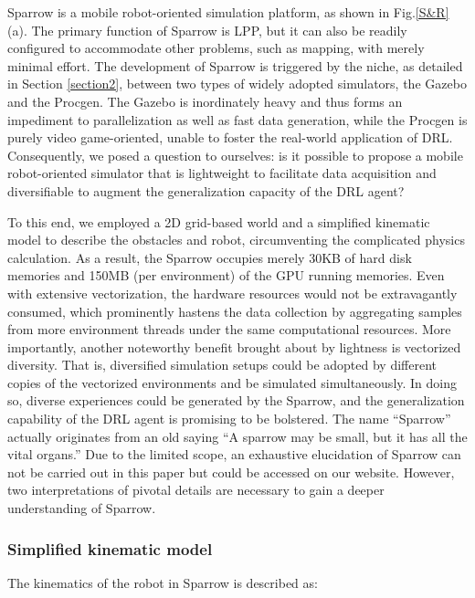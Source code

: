 \documentclass[journal]{IEEEtran}
\begin{document}
Sparrow is a mobile robot-oriented simulation platform, as shown in Fig.\ref{S&R}(a). The primary function of Sparrow is LPP, but it can also be readily configured to accommodate other problems, such as mapping, with merely minimal effort. The development of Sparrow is triggered by the niche, as detailed in Section \ref{section2}, between two types of widely adopted simulators, the Gazebo and the Procgen. The Gazebo is inordinately heavy and thus forms an impediment to parallelization as well as fast data generation, while the Procgen is purely video game-oriented, unable to foster the real-world application of DRL. Consequently, we posed a question to ourselves: is it possible to propose a mobile robot-oriented simulator that is lightweight to facilitate data acquisition and diversifiable to augment the generalization capacity of the DRL agent? 

To this end, we employed a 2D grid-based world and a simplified kinematic model to describe the obstacles and robot, circumventing the complicated physics calculation. As a result, the Sparrow occupies merely 30KB of hard disk memories and 150MB (per environment) of the GPU running memories. Even with extensive vectorization, the hardware resources would not be extravagantly consumed, which prominently hastens the data collection by aggregating samples from more environment threads under the same computational resources. More importantly, another noteworthy benefit brought about by lightness is vectorized diversity. That is, diversified simulation setups could be adopted by different copies of the vectorized environments and be simulated simultaneously. In doing so, diverse experiences could be generated by the Sparrow, and the generalization capability of the DRL agent is promising to be bolstered. The name “Sparrow” actually originates from an old saying “A sparrow may be small, but it has all the vital organs.” Due to the limited scope, an exhaustive elucidation of Sparrow can not be carried out in this paper but could be accessed on our website\footnotemark[1]. However, two interpretations of pivotal details are necessary to gain a deeper understanding of Sparrow.


\subsubsection{Simplified kinematic model}
The kinematics of the robot in Sparrow is described as:
\end{document}
